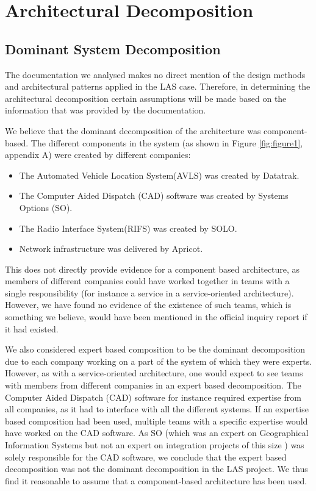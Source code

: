 \section*{Architectural Decomposition}

\subsection*{Dominant System Decomposition}

The documentation we analysed makes no direct mention of the design methods and architectural patterns applied in the LAS case.
Therefore, in determining the architectural decomposition certain assumptions will be made based on the information that was provided by the documentation.

We believe that the dominant decomposition of the architecture was component-based.
The different components in the system (as shown in Figure \ref{fig:figure1}, appendix A) were created by different companies:
\begin{itemize}[noitemsep]
\item The Automated Vehicle Location System(AVLS) was created by Datatrak.
\item The Computer Aided Dispatch (CAD) software was created by Systems Options (SO).
\item The Radio Interface System(RIFS) was created by SOLO.
\item Network infrastructure was delivered by Apricot.
\end{itemize}

This does not directly provide evidence for a component based architecture, as members of different companies could have worked together in teams with a single responsibility
(for instance a service in a service-oriented architecture).
However, we have found no evidence of the existence of such teams, which is something we believe, would have been mentioned in the official inquiry report \autocite{officialreport} if it had existed.

We also considered expert based composition to be the dominant decomposition due to each company working on a part of the system of which they were experts.
However, as with a service-oriented architecture, one would expect to see teams with members from different companies in an expert based decomposition.
The Computer Aided Dispatch (CAD) software for instance required expertise from all companies, as it had to interface with all the different systems.
If an expertise based composition had been used, multiple teams with a specific expertise would have worked on the CAD software.
As SO (which was an expert on Geographical Information Systems \autocite{techsum} but not an expert on integration projects of this size \autocite[3078]{officialreport}) was solely responsible for the CAD software,
we conclude that the expert based decomposition was not the dominant decomposition in the LAS project.
We thus find it reasonable to assume that a component-based architecture has been used.

